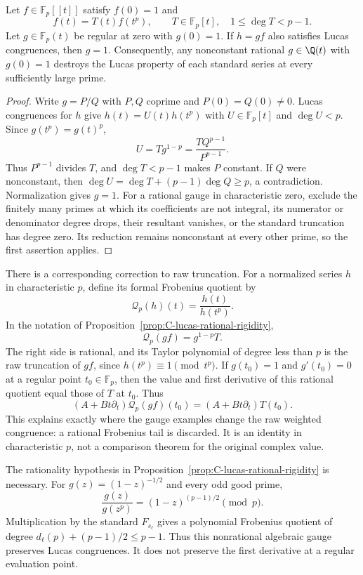 \begin{proposition}
\label{prop:C-lucas-rational-rigidity}
Let $f\in\mathbb F_p[[t]]$ satisfy $f(0)=1$ and
\[
 f(t)=T(t)f(t^p),\qquad T\in\mathbb F_p[t],\quad
 1\leq\deg T<p-1.
\]
Let $g\in\mathbb F_p(t)$ be regular at zero with $g(0)=1$.
If $h=gf$ also satisfies Lucas congruences, then $g=1$.
Consequently, any nonconstant rational $g\in\Q(t)$ with $g(0)=1$
destroys the Lucas property of each standard series at every
sufficiently large prime.
\end{proposition}
\begin{proof}
Write $g=P/Q$ with $P,Q$ coprime and $P(0)=Q(0)\ne0$.
Lucas congruences for $h$ give $h(t)=U(t)h(t^p)$ with
$U\in\mathbb F_p[t]$ and $\deg U<p$. Since $g(t^p)=g(t)^p$,
\[
 U=Tg^{1-p}=\frac{TQ^{p-1}}{P^{p-1}}.
\]
Thus $P^{p-1}$ divides $T$, and $\deg T<p-1$ makes $P$ constant.
If $Q$ were nonconstant, then
$\deg U=\deg T+(p-1)\deg Q\geq p$, a contradiction.
Normalization gives $g=1$.
For a rational gauge in characteristic zero, exclude the finitely
many primes at which its coefficients are not integral, its numerator
or denominator degree drops, their resultant vanishes, or the
standard truncation has degree zero. Its reduction remains
nonconstant at every other prime, so the first assertion applies.
\end{proof}

There is a corresponding correction to raw truncation. For a normalized
series $h$ in characteristic $p$, define its formal Frobenius quotient by
\[
 \mathcal Q_p(h)(t)=\frac{h(t)}{h(t^p)}.
\]
In the notation of Proposition~\ref{prop:C-lucas-rational-rigidity},
\begin{equation}\label{eq:C-lucas-gauge-covariance}
 \mathcal Q_p(gf)=g^{1-p}T.
\end{equation}
The right side is rational, and its Taylor polynomial of degree less
than $p$ is the raw truncation of $gf$, since $h(t^p)\equiv1\pmod{t^p}$.
If $g(t_0)=1$ and $g'(t_0)=0$ at a regular point $t_0\in\mathbb F_p$,
then the value and first derivative of this rational quotient equal
those of $T$ at $t_0$. Thus
\[
 (A+Bt\partial_t)\mathcal Q_p(gf)(t_0)
 =(A+Bt\partial_t)T(t_0).
\]
This explains exactly where the gauge examples change the raw
weighted congruence: a rational Frobenius tail is discarded.
It is an identity in characteristic $p$, not a comparison theorem
for the original complex value.

\begin{remark}
\label{rem:C-algebraic-lucas-gauge}
The rationality hypothesis in
Proposition~\ref{prop:C-lucas-rational-rigidity} is necessary.
For $g(z)=(1-z)^{-1/2}$ and every odd good prime,
\[
 \frac{g(z)}{g(z^p)}=(1-z)^{(p-1)/2}\pmod p.
\]
Multiplication by the standard $F_{s_\ell}$ gives a polynomial
Frobenius quotient of degree $d_\ell(p)+(p-1)/2\leq p-1$.
Thus this nonrational algebraic gauge preserves Lucas congruences.
It does not preserve the first derivative at a regular evaluation point.
\end{remark}

